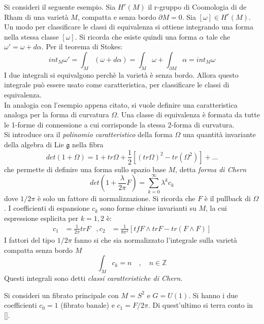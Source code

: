 Si consideri il seguente esempio. Sia $H^r(M)$ il r-gruppo di Coomologia di de Rham
di una varietà $M$, compatta e senza bordo $\partial M = 0$.
Sia $[\omega] \in H^r(M)$.\\
Un modo per classificare le classi di equivalenza si ottiene integrando una forma
nella stessa classe $[\omega]$. Si ricorda che esiste quindi una forma $\alpha$
tale che $\omega' = \omega + d\alpha$. Per il teorema di Stokes:
$$ int_M \omega' = \int_M (\omega + d\alpha) = \int_M \omega
   + \int_{\partial M} \alpha = int_M \omega $$
I due integrali si equivalgono perchè la varietà è senza bordo. Allora questo integrale
può essere usato come caratteristica, per classificare le classi di equivalenza.\\

In analogia con l'esempio appena citato, si vuole definire una caratteristica
analoga per la forma di curvatura $\Omega$. Una classe di equivalenza è formata
da tutte le 1-forme di connessione a cui corrisponde la stessa 2-forma di curvatura.\\
Si introduce ora il \emph{polinomio caratteristico} della forma $\Omega$ una quantità
invariante della algebra di Lie $\mathfrak{g}$ nella fibra
$$ det(1+\Omega) = 1 + tr\Omega + \frac{1}{2}[(tr\Omega)^2 - tr(\Omega^2)] + \dots $$
che permette di definire una forma sullo spazio base $M$, detta \emph{forma di Chern}
$$ det(1 + \frac{\lambda}{2\pi}F) = \sum_{k=0}^\infty \lambda^k c_k $$
dove $1/2\pi$ è solo un fattore di normalizzazione. Si ricorda che $F$ è il pullback
di $\Omega$. I coefficienti di espansione $c_k$ sono forme chiuse invarianti su $M$,
la cui espressione esplicita per $k = 1,2$ è:
\begin{equation}
   \begin{aligned}
      c_1 &= \frac{1}{2\pi} trF &,
      c_2 & = \frac{1}{8\pi^2}[ tfF \wedge trF - tr(F \wedge F)]
   \end{aligned}
\end{equation}
I fattori del tipo $1/2\pi$ fanno si che sia normalizzato l'integrale sulla varietà
compatta senza bordo $M$
\begin{equation}
   \int_M c_k = n \quad , \quad n \in \mathbb{Z}
\end{equation}
Questi integrali sono detti \emph{classi caratteristiche di Chern}.

\begin{example}\label{ex:monopolechern}
   Si consideri un fibrato principale con $M = S^2$ e $G = U(1)$. Si hanno i due
   coefficienti $c_0 = 1$ (fibrato banale) e $c_1 = F/2\pi$. Di quest'ultimo si
   terra conto in \ref{}.
\end{example}

